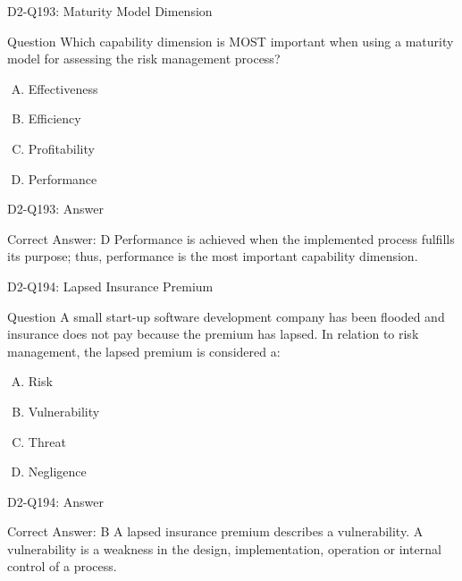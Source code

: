 \documentclass{beamer}
\begin{document}
	\begin{frame}{D2-Q193: Maturity Model Dimension}
		\begin{block}{Question}
			Which capability dimension is MOST important when using a maturity model for assessing the risk management process?
		\end{block}
		\begin{enumerate}[(A)]
			\item Effectiveness
			\item Efficiency
			\item Profitability
			\item Performance
		\end{enumerate}
	\end{frame}
	\begin{frame}{D2-Q193: Answer}
		\begin{block}{Correct Answer: D}
			Performance is achieved when the implemented process fulfills its purpose; thus, performance is the most important capability dimension.
		\end{block}
	\end{frame}
	
	\begin{frame}{D2-Q194: Lapsed Insurance Premium}
		\begin{block}{Question}
			A small start-up software development company has been flooded and insurance does not pay because the premium has lapsed. In relation to risk management, the lapsed premium is considered a:
		\end{block}
		\begin{enumerate}[(A)]
			\item Risk
			\item Vulnerability
			\item Threat
			\item Negligence
		\end{enumerate}
	\end{frame}
	\begin{frame}{D2-Q194: Answer}
		\begin{block}{Correct Answer: B}
			A lapsed insurance premium describes a vulnerability. A vulnerability is a weakness in the design, implementation, operation or internal control of a process.
		\end{block}
	\end{frame}
	
\end{document}
